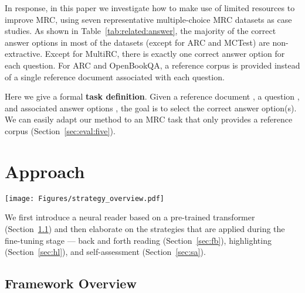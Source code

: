 \documentclass[11pt,a4paper]{article}
\begin{document}
In response, in this paper we investigate how to make use of limited resources to improve MRC, using seven representative multiple-choice MRC datasets as case studies. As shown in Table~\ref{tab:related:answer}, the majority of the correct answer options in most of the datasets (except for ARC and MCTest) are non-extractive. Except for MultiRC, there is exactly one correct answer option for each question. For ARC and OpenBookQA, a reference corpus is provided instead of a single reference document associated with each question.

Here we give a formal \textbf{task definition}. Given a reference document , a question , and associated answer options , the goal is to select the correct answer option(s). We can easily adapt our method to an MRC task that only provides a reference corpus (Section~\ref{sec:eval:five}).









 \section{Approach}
\label{sec:method}

\begin{figure*}[htbp!]
   \begin{center}
   \texttt{[image: Figures/strategy\_overview.pdf]}
   \end{center}
\caption{Framework Overview. Strategy 1, 2, and 3 refer to back and forth reading (BF) (Section~\ref{sec:fb}), highlighting (HL) (Section~\ref{sec:hl}), and self-assessment (SA) (Section~\ref{sec:sa}), respectively.}
 \label{fig:overview}
\end{figure*}


We first introduce a neural reader based on a pre-trained transformer (Section~\ref{sec:trans}) and then elaborate on the strategies that are applied during the fine-tuning stage ---  back and forth reading (Section~\ref{sec:fb}), highlighting (Section~\ref{sec:hl}), and self-assessment (Section~\ref{sec:sa}). 




\subsection{Framework Overview}
\label{sec:trans}
\end{document}

